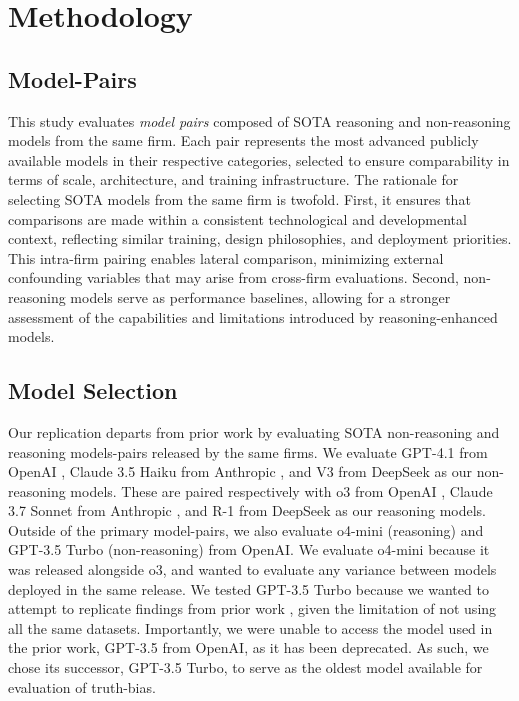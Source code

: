 \documentclass{article}
\begin{document}
\section{Methodology}
\label{sec:methodology}

\subsection{Model-Pairs}

This study evaluates \textit{model pairs} composed of SOTA reasoning and non-reasoning models from the same firm. Each pair represents the most advanced publicly available models in their respective categories, selected to ensure comparability in terms of scale, architecture, and training infrastructure. The rationale for selecting SOTA models from the same firm is twofold. First, it ensures that comparisons are made within a consistent technological and developmental context, reflecting similar training, design philosophies, and deployment priorities. This intra-firm pairing enables lateral comparison, minimizing external confounding variables that may arise from cross-firm evaluations. Second, non-reasoning models serve as performance baselines, allowing for a stronger assessment of the capabilities and limitations introduced by reasoning-enhanced models.

\subsection{Model Selection}

Our replication departs from prior work \citep{markowitz_generative_2024} by evaluating SOTA non-reasoning and reasoning models-pairs released by the same firms. We evaluate GPT-4.1 from OpenAI \citep{OpenAI_4-1_API_2025}, Claude 3.5 Haiku from Anthropic \citep{anthropic_claude_2024}, and V3 from DeepSeek \citep{deepseekai2025deepseekv3technicalreport} as our non-reasoning models. These are paired respectively with o3 from OpenAI \citep{openai_o3_o4m_systemcard2024}, Claude 3.7 Sonnet from Anthropic \citep{anthropic_claude_2025}, and R-1 from DeepSeek \citep{deepseek-ai_deepseek-r1_2025} as our reasoning models. Outside of the primary model-pairs, we also evaluate o4-mini (reasoning) \citep{openai_o3_o4m_systemcard2024} and GPT-3.5 Turbo (non-reasoning) \citep{openai_gpt-3-5-turbo} from OpenAI. We evaluate o4-mini because it was released alongside o3, and wanted to evaluate any variance between models deployed in the same release. We tested GPT-3.5 Turbo because we wanted to attempt to replicate findings from prior work \citep{markowitz_generative_2024}, given the limitation of not using all the same datasets. Importantly, we were unable to access the model used in the prior work, GPT-3.5 from OpenAI, as it has been deprecated. As such, we chose its successor, GPT-3.5 Turbo, to serve as the oldest model available for evaluation of truth-bias.
\end{document}
